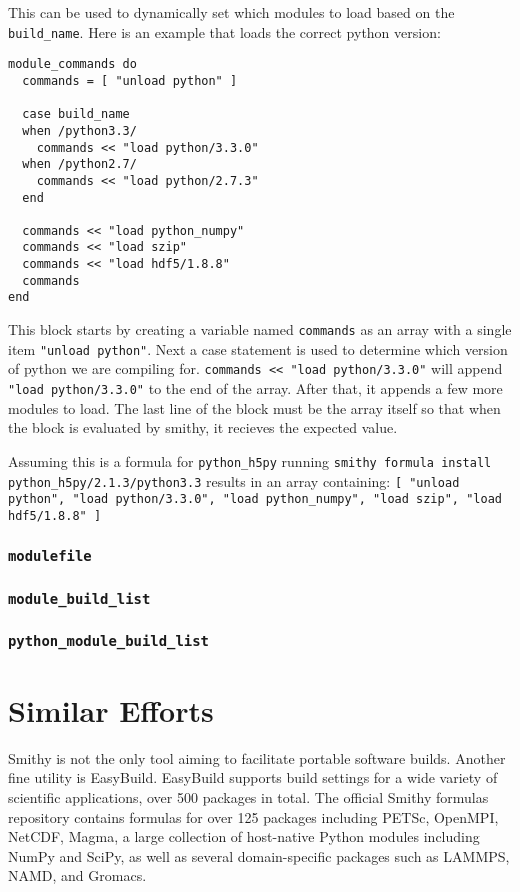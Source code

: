 \documentclass{acm_proc_article-sp}
\begin{document}
This can be used to dynamically set which modules to load based on the
\texttt{build\_name}. Here is an example that loads the correct python version:

\begin{quoting}
\begin{verbatim}
module_commands do
  commands = [ "unload python" ]

  case build_name
  when /python3.3/
    commands << "load python/3.3.0"
  when /python2.7/
    commands << "load python/2.7.3"
  end

  commands << "load python_numpy"
  commands << "load szip"
  commands << "load hdf5/1.8.8"
  commands
end
\end{verbatim}
\end{quoting}

This block starts by creating a variable named \texttt{commands} as an array with a
single item \texttt{"unload python"}. Next a case statement is used to determine which
version of python we are compiling for. \texttt{commands << "load python/3.3.0"} will
append \texttt{"load python/3.3.0"} to the end of the array.  After that, it appends a
few more modules to load.  The last line of the block must be the array itself
so that when the block is evaluated by smithy, it recieves the expected value.

Assuming this is a formula for \texttt{python\_h5py} running \texttt{smithy
formula install python\_h5py/2.1.3/python3.3} results in an array containing:
\texttt{[ "unload python", "load python/3.3.0", "load python\_numpy", "load szip", "load hdf5/1.8.8" ]}

\subsubsection{\texttt{modulefile}}
\subsubsection{\texttt{module\_build\_list}}
\subsubsection{\texttt{python\_module\_build\_list}}

\section{Similar Efforts}

Smithy is not the only tool aiming to facilitate portable software builds.
Another fine utility is EasyBuild\cite{EasyBuild}. EasyBuild supports build
settings for a wide variety of scientific applications, over 500 packages in
total. The official Smithy formulas repository contains formulas for over 125
packages including PETSc, OpenMPI, NetCDF, Magma, a large collection of
host-native Python modules including NumPy and SciPy, as well as several
domain-specific packages such as LAMMPS, NAMD, and Gromacs.
\end{document}
